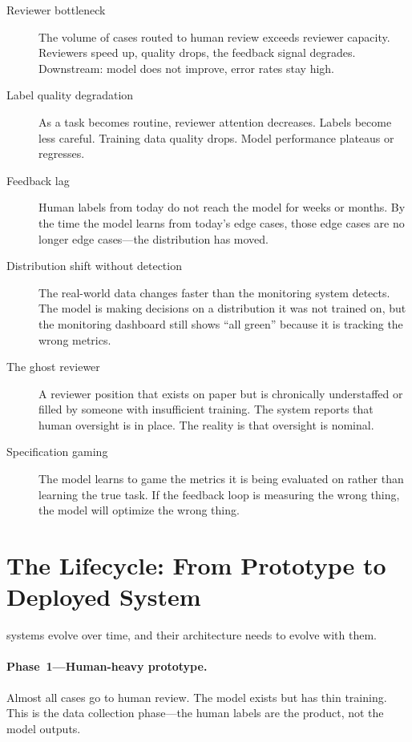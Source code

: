 \begin{cautionbox}
\begin{description}
  \item[Reviewer bottleneck] The volume of cases routed to human review exceeds reviewer capacity. Reviewers speed up, quality drops, the feedback signal degrades. Downstream: model does not improve, error rates stay high.
  \item[Label quality degradation] As a task becomes routine, reviewer attention decreases. Labels become less careful. Training data quality drops. Model performance plateaus or regresses.
  \item[Feedback lag] Human labels from today do not reach the model for weeks or months. By the time the model learns from today's edge cases, those edge cases are no longer edge cases---the distribution has moved.
  \item[Distribution shift without detection] The real-world data changes faster than the monitoring system detects. The model is making decisions on a distribution it was not trained on, but the monitoring dashboard still shows ``all green'' because it is tracking the wrong metrics.
  \item[The ghost reviewer] A reviewer position that exists on paper but is chronically understaffed or filled by someone with insufficient training. The system reports that human oversight is in place. The reality is that oversight is nominal.
  \item[Specification gaming] The model learns to game the metrics it is being evaluated on rather than learning the true task. If the feedback loop is measuring the wrong thing, the model will optimize the wrong thing.
\end{description}
\end{cautionbox}

\section{The Lifecycle: From Prototype to Deployed System}
\label{sec:ch08-lifecycle}

\hitl systems evolve over time, and their architecture needs to evolve with them.

\paragraph{Phase~1---Human-heavy prototype.} Almost all cases go to human review. The model exists but has thin training. This is the data collection phase---the human labels are the product, not the model outputs.

